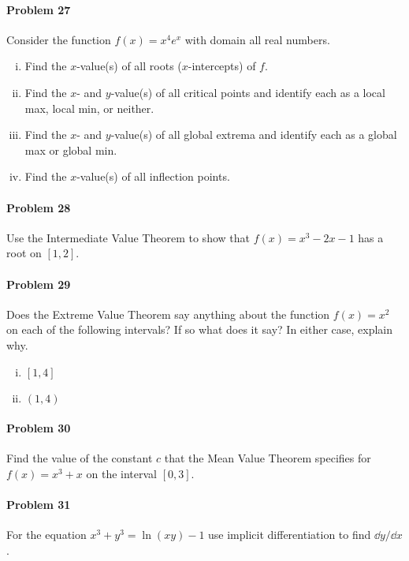 \documentclass[a4paper, 11pt]{article}
\begin{document}
\paragraph{Problem 27}
Consider the function $f(x) = x^4 e^x$ with domain all real numbers.
\begin{enumerate}[(i)]
	\item Find the $x$-value(s) of all roots ($x$-intercepts) of $f$.
	\item Find the $x$- and $y$-value(s) of all critical points and identify each as a local max, local min, or neither.
	\item Find the $x$- and $y$-value(s) of all global extrema and identify each as a global max or global min.
	\item Find the $x$-value(s) of all inflection points.
\end{enumerate}

\paragraph{Problem 28}
Use the Intermediate Value Theorem to show that $f(x) = x^3 - 2x - 1$ has a root on $[1,2]$.


\paragraph{Problem 29}
Does the Extreme Value Theorem say anything about the function $f(x) = x^2$ on each of the following intervals? If so what does it say?  In either case, explain why.
\begin{enumerate}[(i)]
	\item $[1,4]$
	\item $(1,4)$
\end{enumerate}

\paragraph{Problem 30}
Find the value of the constant $c$ that the Mean Value Theorem specifies for $f(x)=x^3 + x$ on the interval $[0,3]$.


\paragraph{Problem 31}
For the equation $x^3 + y^3 = \ln(xy) - 1$ use implicit differentiation to find $\dd y/ \dd x$.
\end{document}
